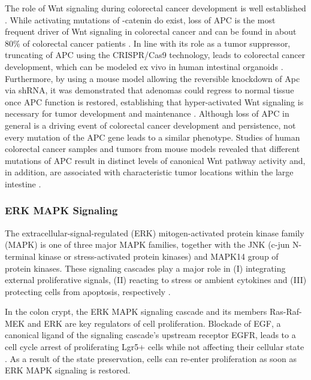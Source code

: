 \begin{flushleft}
The role of Wnt signaling during colorectal cancer development is well established \cite{Polakis2007}. While activating mutations of \textbeta-catenin do exist, loss of APC is the most frequent driver of Wnt signaling in colorectal cancer and can be found in about 80\% of colorectal cancer patients \cite{Fearon1989}. In line with its role as a tumor suppressor, truncating of APC using the CRISPR/Cas9 technology, leads to colorectal cancer development, which can be modeled ex vivo in human intestinal organoids \cite{Matano2015, Drost2015SequentialCells}. Furthermore, by using a mouse model allowing the reversible knockdown of Apc via shRNA, it was demonstrated that adenomas could regress to normal tissue once APC function is restored, establishing that hyper-activated Wnt signaling is necessary for tumor development and maintenance \cite{Dow2015}. 
Although loss of APC in general is a driving event of colorectal cancer development and persistence, not every mutation of the APC gene leads to a similar phenotype. Studies of human colorectal cancer samples and tumors from mouse models revealed that different mutations of APC result in distinct levels of canonical Wnt pathway activity and, in addition, are associated with characteristic tumor locations within the large intestine \cite{Christie2013, Buchert2010}. \par

\subsubsection{ERK MAPK Signaling}

The extracellular-signal-regulated (ERK) mitogen-activated protein kinase family (MAPK) is one of three major MAPK families, together with the JNK (c-jun N-terminal kinase or stress-activated protein kinases) and MAPK14 group of protein kinases. These signaling cascades play a major role in (I) integrating external proliferative signals, (II) reacting to stress or ambient cytokines and (III) protecting cells from apoptosis, respectively \cite{Oncol2005}. 

In the colon crypt, the ERK MAPK signaling cascade and its members Ras-Raf-MEK and ERK are key regulators of cell proliferation. Blockade of EGF, a canonical ligand of the signaling cascade's upstream receptor EGFR, leads to a cell cycle arrest of proliferating Lgr5+ cells while not affecting their cellular state \cite{basakInducedQuiescenceLgr52017a}. As a result of the state preservation, cells can re-enter proliferation as soon as ERK MAPK signaling is restored.


\end{flushleft}
